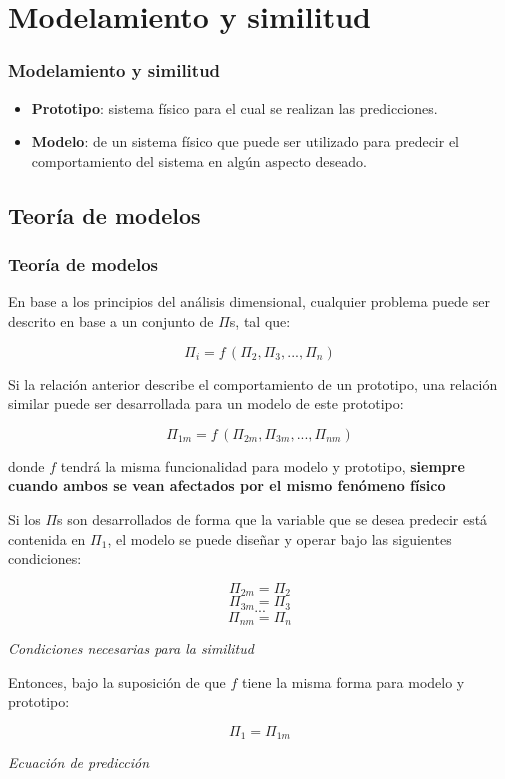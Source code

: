 \documentclass[t]{beamer}
\begin{document}
\section{Modelamiento y similitud}
\begin{frame}[c]
\frametitle{Modelamiento y similitud}

{}

\begin{itemize}
\item \justifying
  \textbf{Prototipo}: sistema físico para el cual se realizan las predicciones.
\item \justifying
  \textbf{Modelo}: \textbf{\color{red}{representación}} de un sistema físico que puede ser utilizado
  para predecir el comportamiento del sistema en algún aspecto deseado.
\end{itemize}
\end{frame}

\subsection{Teoría de modelos}
\begin{frame}
\frametitle{Teor\'ia de modelos}
En base a los principios del an\'alisis dimensional, cualquier problema puede ser descrito en base a un conjunto de $\Pi$s, tal que:

$$\Pi_i = f\,(\Pi_2,\Pi_3,..., \Pi_n)$$

Si la relaci\'on anterior describe el comportamiento de un prototipo, una relaci\'on similar puede ser desarrollada para un modelo de este prototipo:

$$\Pi_{1m} = f\,(\Pi_{2m},\Pi_{3m},...,\Pi_{nm})$$

 donde $f$ tendr\'a la misma funcionalidad para modelo y prototipo, \textbf{siempre cuando ambos se vean afectados por el mismo fen\'omeno f\'isico}
\end{frame}

\begin{frame}
Si los $\Pi$s son desarrollados de forma que la variable que se desea predecir est\'a contenida en $\Pi_1$, el modelo se puede diseñar y operar bajo las siguientes condiciones:

$$\Pi_{2m} = \Pi_2$$
$$\Pi_{3m} = \Pi_3$$
$$...$$
$$\Pi_{nm} = \Pi_{n}$$

 \begin{center}\textit{Condiciones necesarias para la similitud}\end{center}

 Entonces, bajo la suposici\'on de que $f$ tiene la misma forma para modelo y prototipo:

$$ \Pi_{1} = \Pi_{1m}$$

 \begin{center}\textit{Ecuaci\'on de predicci\'on}\end{center}
\end{frame}
\end{document}
